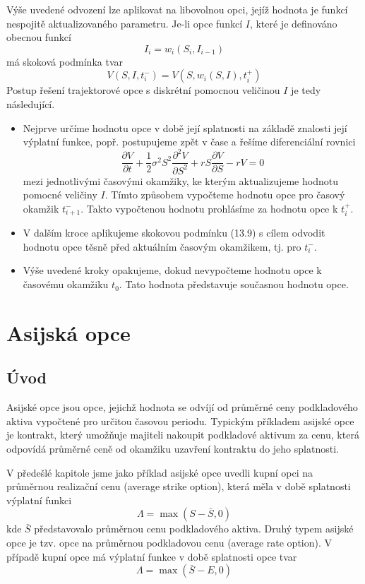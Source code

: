 \documentclass[a4paper]{book}
\begin{document}
Výše uvedené odvození lze aplikovat na libovolnou opci, jejíž hodnota je funkcí nespojitě aktualizovaného parametru. Je-li opce funkcí $I$, které je definováno obecnou funkcí
\begin{equation*}
I_i = w_i(S_i, I_{i-1})
\end{equation*}
má skoková podmínka tvar
\begin{equation}
V(S, I, t_i^{-}) = V(S, w_i(S,I), t_i^{+})
\end{equation}
Postup řešení trajektorové opce s diskrétní pomocnou veličinou $I$ je tedy následující.
\begin{itemize}
\item Nejprve určíme hodnotu opce v době její splatnosti na základě znalosti její výplatní funkce, popř. postupujeme zpět v čase a řešíme diferenciální rovnici
\begin{equation*}
\frac{\partial V}{\partial t} + \frac{1}{2} \sigma^2 S^2 \frac{\partial^2 V}{\partial S^2} + rS \frac{\partial V}{\partial S} - rV = 0
\end{equation*}
mezi jednotlivými časovými okamžiky, ke kterým aktualizujeme hodnotu pomocné veličiny $I$. Tímto způsobem vypočteme hodnotu opce pro časový okamžik $t_{i+1}^{-}$. Takto vypočtenou hodnotu prohlásíme za hodnotu opce k $t_{i}^{+}$.
\item V dalším kroce aplikujeme skokovou podmínku (13.9) s cílem odvodit hodnotu opce těsně před aktuálním časovým okamžikem, tj. pro $t_i^{-}$.
\item Výše uvedené kroky opakujeme, dokud nevypočteme hodnotu opce k časovému okamžiku $t_0$. Tato hodnota představuje současnou hodnotu opce.
\end{itemize}

\chapter{Asijská opce}

\section{Úvod}

Asijské opce jsou opce, jejichž hodnota se odvíjí od průměrné ceny podkladového aktiva vypočtené pro určitou časovou periodu. Typickým příkladem asijské opce je kontrakt, který umožňuje majiteli nakoupit podkladové aktivum za cenu, která odpovídá průměrné ceně od okamžiku uzavření kontraktu do jeho splatnosti.

V předešlé kapitole jsme jako příklad asijské opce uvedli kupní opci na průměrnou realizační cenu (average strike option), která měla v době splatnosti výplatní funkci
\begin{equation*}
\Lambda = \max(S - \bar{S}, 0) 
\end{equation*}
kde $\bar{S}$ představovalo průměrnou cenu podkladového aktiva. Druhý typem asijské opce je tzv. opce na průměrnou podkladovou cenu (average rate option). V případě kupní opce má výplatní funkce v době splatnosti opce tvar
\begin{equation*}
\Lambda = \max(\bar{S} - E, 0) 
\end{equation*}
\end{document}
